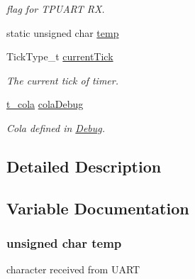 \begin{DoxyCompactItemize}
\begin{DoxyCompactList}\small\item\em flag for T\+P\+U\+A\+RT RX. \end{DoxyCompactList}\item 
static unsigned char \hyperlink{group___k_n_x___p_h___sup___private___variables_gabe413cb96d839cbe31417aa52d920f21}{temp}
\item 
Tick\+Type\+\_\+t \hyperlink{group___k_n_x___p_h___sup___private___variables_gae5c3d180a41e0a10e05863aa365a5596}{current\+Tick}\hypertarget{group___k_n_x___p_h___sup___private___variables_gae5c3d180a41e0a10e05863aa365a5596}{}\label{group___k_n_x___p_h___sup___private___variables_gae5c3d180a41e0a10e05863aa365a5596}

\begin{DoxyCompactList}\small\item\em The current tick of timer. \end{DoxyCompactList}\item 
\hyperlink{structt__cola}{t\+\_\+cola} \hyperlink{group___k_n_x___p_h___sup___private___variables_ga314fd637d927bd6a2551e119de623aa5}{cola\+Debug}\hypertarget{group___k_n_x___p_h___sup___private___variables_ga314fd637d927bd6a2551e119de623aa5}{}\label{group___k_n_x___p_h___sup___private___variables_ga314fd637d927bd6a2551e119de623aa5}

\begin{DoxyCompactList}\small\item\em Cola defined in \hyperlink{group___debug}{Debug}. \end{DoxyCompactList}\end{DoxyCompactItemize}


\subsection{Detailed Description}


\subsection{Variable Documentation}
\subsubsection[{\texorpdfstring{temp}{temp}}]{\setlength{\rightskip}{0pt plus 5cm}unsigned char temp\hspace{0.3cm}{\ttfamily [static]}}\hypertarget{group___k_n_x___p_h___sup___private___variables_gabe413cb96d839cbe31417aa52d920f21}{}\label{group___k_n_x___p_h___sup___private___variables_gabe413cb96d839cbe31417aa52d920f21}
character received from U\+A\+RT 